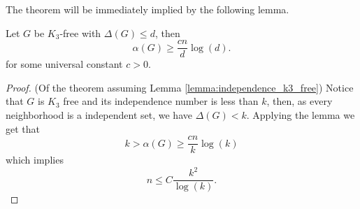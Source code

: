 The theorem will be immediately implied by the following lemma.
\begin{lemma}
	\label{lemma:independence_k3_free}
	Let $G$ be $K_3$-free with $\Delta(G) \leq d$, then
	\[
		\alpha(G) \geq \frac{cn}{d}\log(d).
	\]
	for some universal constant $c > 0$.
\end{lemma}

\begin{proof}
	(Of the theorem assuming Lemma \ref{lemma:independence_k3_free})
	Notice that $G$ is $K_3$ free and
	its independence number is less than $k$, then, as every
	neighborhood is a independent set, we have $\Delta(G) < k$.
	Applying the lemma we get that
	\[
		k > \alpha(G) \geq \frac{cn}{k}\log(k)
	\]
	which implies
	\[
		n \leq C\frac{k^2}{\log(k)}.
	\]
\end{proof}

